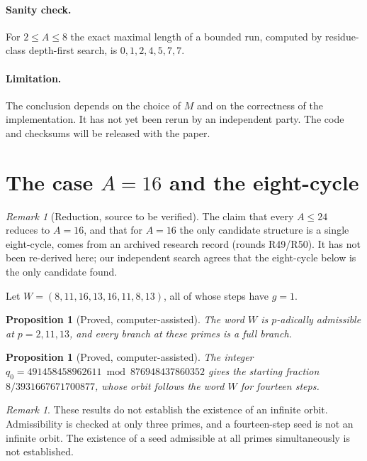 \documentclass[11pt]{amsart}
\theoremstyle{plain}
\newtheorem{proposition}[theorem]{Proposition}
\theoremstyle{definition}
\theoremstyle{remark}
\newtheorem{remark}[theorem]{Remark}
\begin{document}
\paragraph{Sanity check.} For $2\le A\le 8$ the exact maximal length of a bounded run, computed by residue-class depth-first search, is $0,1,2,4,5,7,7$.

\paragraph{Limitation.} The conclusion depends on the choice of $M$ and on the correctness of the implementation. It has not yet been rerun by an independent party. The code and checksums will be released with the paper.

\section{The case $A=16$ and the eight-cycle}\label{sec:sixteen}

\begin{remark}[Reduction, source to be verified]
The claim that every $A\le 24$ reduces to $A=16$, and that for $A=16$ the only candidate structure is a single eight-cycle, comes from an archived research record (rounds R49/R50). It has not been re-derived here; our independent search agrees that the eight-cycle below is the only candidate found.
\end{remark}

Let $W=(8,11,16,13,16,11,8,13)$, all of whose steps have $g=1$.

\begin{proposition}[Proved, computer-assisted]
The word $W$ is $p$-adically admissible at $p=2,11,13$, and every branch at these primes is a full branch.
\end{proposition}

\begin{proposition}[Proved, computer-assisted]
The integer $q_0=491458458962611 \bmod 876948437860352$ gives the starting fraction $8/3931667671700877$, whose orbit follows the word $W$ for fourteen steps.
\end{proposition}

\begin{remark}
These results do not establish the existence of an infinite orbit. Admissibility is checked at only three primes, and a fourteen-step seed is not an infinite orbit. The existence of a seed admissible at all primes simultaneously is not established.
\end{remark}
\end{document}
